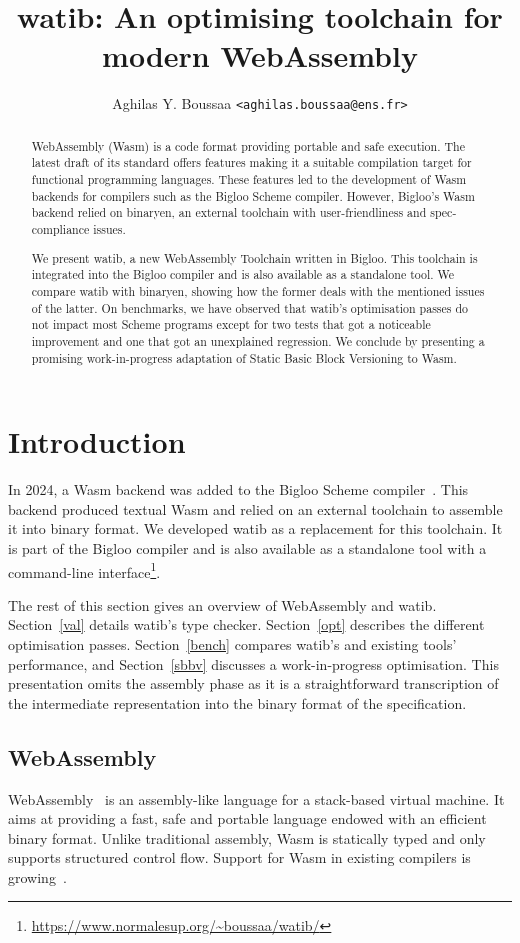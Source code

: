 \documentclass[a4paper,11pt]{article}
\author{Aghilas Y. Boussaa \texttt{<aghilas.boussaa@ens.fr>}}
\title{\textsf{watib}: An optimising toolchain for modern WebAssembly}
\begin{document}
\sloppy
\maketitle
\begin{abstract}
  WebAssembly (Wasm) is a code format providing portable and safe execution.
  The latest draft of its standard offers features making it a suitable
  compilation target for functional programming languages. These features led to
  the development of Wasm backends for compilers such as the Bigloo Scheme
  compiler. However, Bigloo's Wasm backend relied on binaryen, an external
  toolchain with user-friendliness and spec-compliance issues.

  We present \textsf{watib}, a new WebAssembly Toolchain written in Bigloo. This
  toolchain is integrated into the Bigloo compiler and is also available as a
  standalone tool. We compare \textsf{watib} with binaryen, showing how the
  former deals with the mentioned issues of the latter. On benchmarks, we have
  observed that \textsf{watib}'s optimisation passes do not impact most Scheme
  programs except for two tests that got a noticeable improvement and one that
  got an unexplained regression. We conclude by presenting a promising
  work-in-progress adaptation of Static Basic Block Versioning to Wasm.
\end{abstract}

\section{Introduction}
In 2024, a Wasm backend was added to the Bigloo Scheme compiler~\cite{Bigloo}.
This backend produced textual Wasm and relied on an external toolchain to
assemble it into binary format. We developed \textsf{watib} as a replacement for
this toolchain. It is part of the Bigloo compiler and is also available as a
standalone tool with a command-line
interface\footnote{\url{https://www.normalesup.org/~boussaa/watib/}}.

The rest of this section gives an overview of WebAssembly and \textsf{watib}.
Section~\ref{val} details \textsf{watib}'s type checker. Section~\ref{opt}
describes the different optimisation passes. Section~\ref{bench} compares
\textsf{watib}'s and existing tools' performance, and Section~\ref{sbbv}
discusses a work-in-progress optimisation. This presentation omits the assembly
phase as it is a straightforward transcription of the intermediate
representation into the binary format of the specification.
\subsection{WebAssembly}
WebAssembly~\cite{haas2017bringing} is an assembly-like language for a
stack-based virtual machine. It aims at providing a fast, safe and portable
language endowed with an efficient binary format. Unlike traditional assembly,
Wasm is statically typed and only supports structured control flow. Support for
Wasm in existing compilers is growing~\cite{emscripten, kotlin, ocaml, ruby}.
\end{document}
